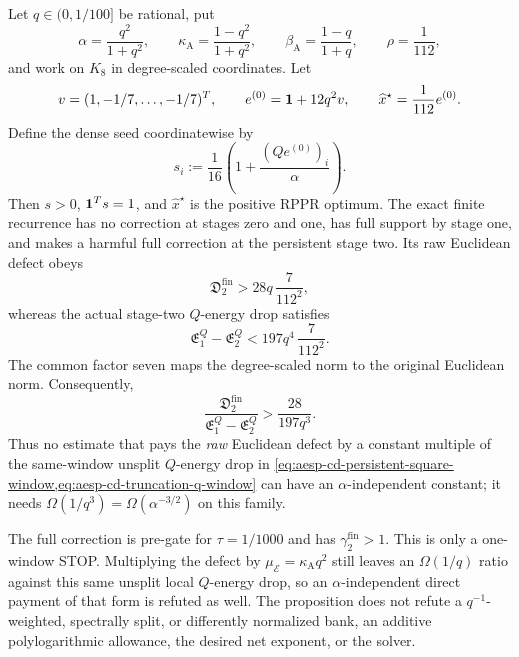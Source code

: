 \begin{proposition}
\label{prop:aesp-cd-k8-q-bank-stop}
Let $q\in(0,1/100]$ be rational, put
\begin{equation*}
 \alpha=\frac{q^2}{1+q^2},\qquad
 \kappa_{\mathrm A}=\frac{1-q^2}{1+q^2},\qquad
 \beta_{\mathrm A}=\frac{1-q}{1+q},\qquad
 \rho=\frac1{112},
\end{equation*}
and work on $K_8$ in degree-scaled coordinates.  Let
\begin{equation*}
 v=(1,-1/7,\ldots,-1/7)^T,
 \qquad e^{(0)}=\mathbf{1}+12q^2v,
 \qquad \widehat x^\star=\frac1{112}e^{(0)}.
\end{equation*}
Define the dense seed coordinatewise by
\begin{equation}
 s_i:=\frac1{16}\left(1+\frac{(Qe^{(0)})_i}{\alpha}\right).
 \label{eq:aesp-cd-k8-q-family-seed}
\end{equation}
Then $s>0$, $\mathbf{1}^Ts=1$, and $\widehat x^\star$ is the positive RPPR
optimum.  The exact finite recurrence has no correction at stages zero and
one, has full support by stage one, and makes a harmful full correction at
the persistent stage two.  Its raw Euclidean defect obeys
\begin{equation}
 \mathfrak D_2^{\mathrm{fin}}>28q\,\frac7{112^2},
 \label{eq:aesp-cd-k8-q-family-defect}
\end{equation}
whereas the actual stage-two $Q$-energy drop satisfies
\begin{equation}
 \mathfrak E_1^Q-\mathfrak E_2^Q
 <197q^4\,\frac7{112^2}.
 \label{eq:aesp-cd-k8-q-family-energy-drop}
\end{equation}
The common factor seven maps the degree-scaled norm to the original
Euclidean norm.  Consequently,
\begin{equation}
 \frac{\mathfrak D_2^{\mathrm{fin}}}
      {\mathfrak E_1^Q-\mathfrak E_2^Q}
 >\frac{28}{197q^3}.
 \label{eq:aesp-cd-k8-q-family-ratio}
\end{equation}
Thus no estimate that pays the \emph{raw} Euclidean defect by a constant
multiple of the same-window unsplit $Q$-energy drop in
\cref{eq:aesp-cd-persistent-square-window,eq:aesp-cd-truncation-q-window}
can have an $\alpha$-independent constant; it needs
$\Omega(1/q^3)=\Omega(\alpha^{-3/2})$ on this family.

The full correction is pre-gate for $\tau=1/1000$ and has
$\gamma_2^{\mathrm{fin}}>1$.  This is only a one-window STOP.  Multiplying
the defect by $\mu_{\mathcal E}=\kappa_{\mathrm A}q^2$ still leaves an
$\Omega(1/q)$ ratio against this same unsplit local $Q$-energy drop, so an
$\alpha$-independent direct payment of that form is refuted as well.  The
proposition does not refute a $q^{-1}$-weighted, spectrally split, or
differently normalized bank, an additive polylogarithmic allowance, the
desired net exponent, or the solver.
\end{proposition}


